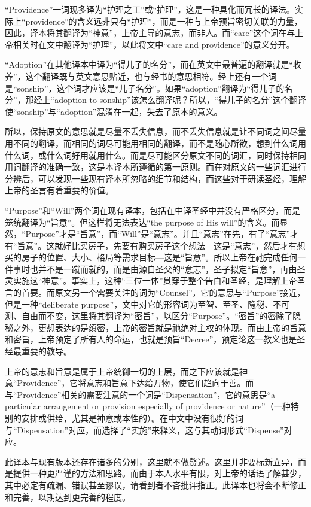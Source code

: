 \documentclass[12pt, a4paper, oneside]{ctexart}
\begin{document}
“Providence”一词现多译为“护理之工”或“护理”，这是一种具化而冗长的译法。实际上“providence”的含义远非只有“护理”，而是一种与上帝预旨密切关联的力量，因此，译本将其翻译为“神意”，上帝主导的意志，而非人。而“care”这个词在与上帝相关时在文中翻译为“护理”，以此将文中“care and providence”的意义分开。

“Adoption”在其他译本中译为“得儿子的名分”，而在英文中最普遍的翻译就是“收养”，这个翻译既与英文意思贴近，也与经书的意思相符。经上还有一个词是“sonship”，这个词才应该是“儿子名分”。如果“adoption”翻译为“得儿子的名分”，那经上“adoption to sonship”该怎么翻译呢？所以，“得儿子的名分”这个翻译使“sonship”与“adoption”混淆在一起，失去了原本的意义。

所以，保持原文的意思就是尽量不丢失信息，而不丢失信息就是让不同词之间尽量用不同的翻译，而相同的词尽可能用相同的翻译，而不是随心所欲，想到什么词用什么词，或什么词好用就用什么。而是尽可能区分原文不同的词汇，同时保持相同用词翻译的准确一致，这是本译本所遵循的第一原则。而在对原文的一些词汇进行分辨后，可以发现一些现有译本所忽略的细节和结构，而这些对于研读圣经，理解上帝的圣言有着重要的价值。

“Purpose”和“Will”两个词在现有译本，包括在中译圣经中并没有严格区分，而是笼统翻译为“旨意”。但这样将无法表达“the purpose of His will”的含义。而显然，“Purpose”才是“旨意”，而“Will”是“意志”。并且“意志”在先，有了“意志”才有“旨意”。这就好比买房子，先要有购买房子这个想法---这是“意志”，然后才有想买的房子的位置、大小、格局等需求目标---这是“旨意”。所以上帝在祂完成任何一件事时也并不是一蹴而就的，而是由源自圣父的“意志”，圣子拟定“旨意”，再由圣灵实施这“神意”。事实上，这种“三位一体”贯穿于整个告白和圣经，是理解上帝圣言的首要。而原文另一个需要关注的词为“Counsel”，它的意思与“Purpose”接近，但是一种“deliberate purpose”，文中对它的形容词为至智、至圣、隐秘、不可测、自由而不变，这里将其翻译为“密旨”，以区分“Purpose”。“密旨”的密除了隐秘之外，更想表达的是缜密，上帝的密旨就是祂绝对主权的体现。而由上帝的旨意和密旨，上帝预定了所有人的命运，也就是预旨“Decree”，预定论这一教义也是圣经最重要的教导。

上帝的意志和旨意是属于上帝统御一切的上层，而之下应该就是神意“Providence”，它将意志和旨意下达给万物，使它们趋向于善。而与“Providence”相关的需要注意的一个词是“Dispensation”，它的意思是“a particular arrangement or provision especially of providence or nature”（一种特别的安排或供给，尤其是神意或本性的）。在中文中没有很好的词与“Dispensation”对应，而选择了“实施”来释义，这与其动词形式“Dispense”对应。

此译本与现有版本还存在诸多的分别，这里就不做赘述。这里并非要标新立异，而是提供一种更严谨的方法和思路。而由于本人水平有限，对上帝的话语了解甚少，其中必定有疏漏、错误甚至谬误，请看到者不吝批评指正。此译本也将会不断修正和完善，以期达到更完善的程度。
\end{document}
